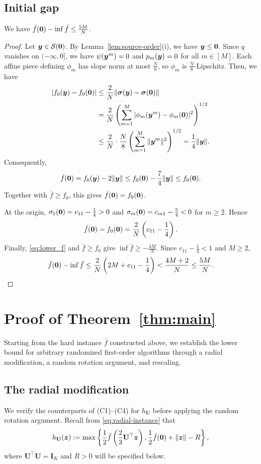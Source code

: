 \subsection{Initial gap}
\label{sec:gap} 
\begin{proposition}
\label{newrand:gap}
We have $ \bar f({\mathbf 0})-\inf \bar f\le\tfrac{5M}{N}$. 
\end{proposition}
\begin{proof}
Let $\bm{y}\in\mathcal S({\mathbf 0})$.
By Lemma~\ref{lem:source-order}(i), we have $\bm{y}\le{\mathbf 0}$.
Since $q$ vanishes on $(-\infty,0]$, we have  $ \psi(\bm{y}^m) =0$ and $ p_m(\bm{y})=0$ for all $m\in [M]$. 
Each affine piece defining $\phi_m$ has slope norm
at most $\tfrac N8$, so $\phi_m$ is
$\tfrac N8$-Lipschitz. Then, we have 
\[
\begin{aligned}
 |f_0(\bm{y})-f_0({\mathbf 0})|
 &\le\frac2N
 \|\boldsymbol\sigma(\bm{y})-\boldsymbol\sigma({\mathbf 0})\|\\
 &=\frac2N
 \left(
 \sum_{m=1}^M
 |\phi_m(\bm{y}^m)-\phi_m({\mathbf 0})|^2
 \right)^{1/2}\\
 &\le\frac2N\cdot\frac N8
 \left(\sum_{m=1}^M\|\bm{y}^m\|^2\right)^{1/2}
 =\frac14\|\bm{y}\|.
\end{aligned}
\]
Consequently,
\[
 \bar f({\mathbf 0})
 =f_0(\bm{y})-2\|\bm{y}\|
 \le f_0({\mathbf 0})-\frac74\|\bm{y}\|
 \le f_0({\mathbf 0}).
\]
Together with $\bar f\ge f_0$, this gives
$\bar f({\mathbf 0})=f_0({\mathbf 0})$.

At the origin,
$\sigma_1({\mathbf 0})=c_{11}-\tfrac14>0$ and
$\sigma_m({\mathbf 0})=c_{m1}-\tfrac54<0$ for $m\ge2$.
Hence
\[
 \bar f({\mathbf 0})=f_0({\mathbf 0})=\frac2N\left(c_{11}-\frac14\right).
\]
Finally, \eqref{eq:lower_f} and $\bar f\ge f_0$ give
$\inf \bar f\ge-\tfrac{4M}{N}$.
Since $c_{11}-\tfrac14<1$ and $M\ge2$,
\[
 \bar f({\mathbf 0})-\inf \bar f
 \le\frac2N\left(2M+c_{11}-\frac14\right)
 <\frac{4M+2}{N}
 \le\frac{5M}{N}.
\]
\end{proof}
\section{Proof of Theorem~\ref{thm:main}}
\label{sec:proof}
Starting from the hard instance $\bar f$ constructed above,
we establish the lower bound for arbitrary randomized
first-order algorithms through a radial modification,
a random rotation argument, and rescaling. 
\subsection{The radial modification}
\label{sec:radial-verification} 
We verify the counterparts of \textnormal{(C1)--(C4)}
for $h_{\mathbf U}$ before applying the random rotation
argument. 
Recall from \eqref{eq:radial-instance} that
\[
 h_{\mathbf{U}}(\bm z)
 :=
 \max\left\{
 \frac12\bar f\left(\frac23\mathbf{U}^\top\bm z\right),
 \frac12\bar f({\mathbf 0})+\|\bm z\|-R
 \right\},
\]
where $\mathbf U^\top\mathbf U=\mathbf I_K$
and $R>0$ will be specified below.

